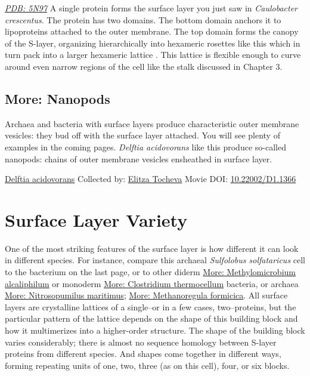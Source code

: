 \documentclass[]{tufte-book}
\begin{document}
\href{http://rcsb.org/structure/5N97}{\emph{PDB: 5N97}}
A single protein forms the surface layer you just saw in \emph{Caulobacter crescentus}. The protein has two domains. The bottom domain anchors it to lipoproteins attached to the outer membrane. The top domain forms the canopy of the S-layer, organizing hierarchically into hexameric rosettes like this which in turn pack into a larger hexameric lattice \citep{bharat2017}. This lattice is flexible enough to curve around even narrow regions of the cell like the stalk discussed in Chapter 3.

\hypertarget{Nanopods}{%
\subsection*{More: Nanopods}\label{Nanopods}}

Archaea and bacteria with surface layers produce characteristic outer membrane vesicles: they bud off with the surface layer attached. You will see plenty of examples in the coming pages. \emph{Delftia acidovorans} like this produce so-called nanopods: chains of outer membrane vesicles ensheathed in surface layer.



\hypertarget{htmlwidget-708a96df3c676e3a3736}{}

\label{fig:2-6a}\protect\hyperlink{tree}{Delftia acidovorans} Collected by: \protect\hyperlink{elitza_tocheva}{Elitza Tocheva} Movie DOI: \href{https://doi.org/10.22002/D1.1366}{10.22002/D1.1366}

\hypertarget{surface-layer-variety}{%
\section{Surface Layer Variety}\label{surface-layer-variety}}

One of the most striking features of the surface layer is how different it can look in different species. For instance, compare this archaeal \emph{Sulfolobus solfataricus} cell to the bacterium on the last page, or to other diderm \protect\hyperlink{Methylomicrobium_alcaliphilum}{More: Methylomicrobium alcaliphilum} or monoderm \protect\hyperlink{Clostridium_thermocellum}{More: Clostridium thermocellum} bacteria, or archaea \protect\hyperlink{Nitrosopumilus_maritimus}{More: Nitrosopumilus maritimus}; \protect\hyperlink{Methanoregula_formicica}{More: Methanoregula formicica}. All surface layers are crystalline lattices of a single--or in a few cases, two--proteins, but the particular pattern of the lattice depends on the shape of this building block and how it multimerizes into a higher-order structure. The shape of the building block varies considerably; there is almost no sequence homology between S-layer proteins from different species. And shapes come together in different ways, forming repeating units of one, two, three (as on this cell), four, or six blocks.
\end{document}
